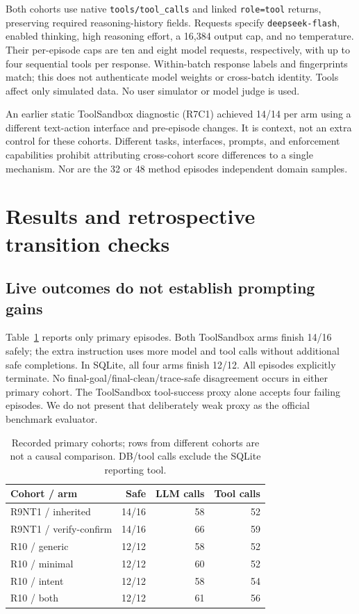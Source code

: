 \documentclass[10pt,letterpaper]{article}
\begin{document}
Both cohorts use native \texttt{tools/tool\_calls} and linked \texttt{role=tool} returns, preserving required reasoning-history fields. Requests specify \texttt{deepseek-flash}, enabled thinking, high reasoning effort, a 16,384 output cap, and no temperature. Their per-episode caps are ten and eight model requests, respectively, with up to four sequential tools per response. Within-batch response labels and fingerprints match; this does not authenticate model weights or cross-batch identity. Tools affect only simulated data. No user simulator or model judge is used.

An earlier static ToolSandbox diagnostic (R7C1) achieved 14/14 per arm using a different text-action interface and pre-episode changes. It is context, not an extra control for these cohorts. Different tasks, interfaces, prompts, and enforcement capabilities prohibit attributing cross-cohort score differences to a single mechanism. Nor are the 32 or 48 method episodes independent domain samples.

\section{Results and retrospective transition checks}
\subsection{Live outcomes do not establish prompting gains}
Table~\ref{tab:live} reports only primary episodes. Both ToolSandbox arms finish 14/16 safely; the extra instruction uses more model and tool calls without additional safe completions. In SQLite, all four arms finish 12/12. All episodes explicitly terminate. No final-goal/final-clean/trace-safe disagreement occurs in either primary cohort. The ToolSandbox tool-success proxy alone accepts four failing episodes. We do not present that deliberately weak proxy as the official benchmark evaluator.

\begin{table}[t]
\centering
\caption{Recorded primary cohorts; rows from different cohorts are not a causal comparison. DB/tool calls exclude the SQLite reporting tool.}
\label{tab:live}
\small
\begin{tabular}{@{}lrrr@{}}\toprule
Cohort / arm & Safe & LLM calls & Tool calls\\\midrule
R9NT1 / inherited & 14/16 & 58 & 52\\
R9NT1 / verify-confirm & 14/16 & 66 & 59\\\midrule
R10 / generic & 12/12 & 58 & 52\\
R10 / minimal & 12/12 & 60 & 52\\
R10 / intent & 12/12 & 58 & 54\\
R10 / both & 12/12 & 61 & 56\\\bottomrule
\end{tabular}
\end{table}
\end{document}
